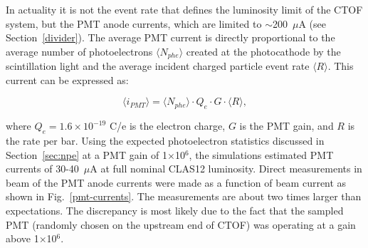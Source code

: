\documentclass{elsart}
\begin{document}
In actuality it is not the event rate that defines the luminosity limit of the CTOF system, but the PMT
anode currents, which are limited to $\sim$200~$\mu$A (see Section~\ref{divider}). The average
PMT current is directly proportional to the average number of photoelectrons $\langle N_{phe} \rangle$
created at the photocathode by the scintillation light and the average incident charged particle event rate
$\langle R \rangle$. This current can be expressed as:

\begin{equation}
\langle i_{PMT} \rangle = \langle N_{phe} \rangle \cdot Q_e \cdot G \cdot \langle R \rangle,
\end{equation}

\noindent
where $Q_e = 1.6 \times 10^{-19}$ C/e is the electron charge, $G$ is the PMT gain, and $R$ is the rate
per bar. Using the expected photoelectron statistics discussed in Section~\ref{sec:npe} at a PMT gain
of 1$\times$10$^6$, the simulations estimated PMT currents of 30-40~$\mu$A at full nominal CLAS12
luminosity. Direct measurements in beam of the PMT anode currents were made as a function of beam
current as shown in Fig.~\ref{pmt-currents}. The measurements are about two times larger than
expectations. The discrepancy is most likely due to the fact that the sampled PMT (randomly chosen on
the upstream end of CTOF) was operating at a gain above 1$\times$10$^6$.
\end{document}
